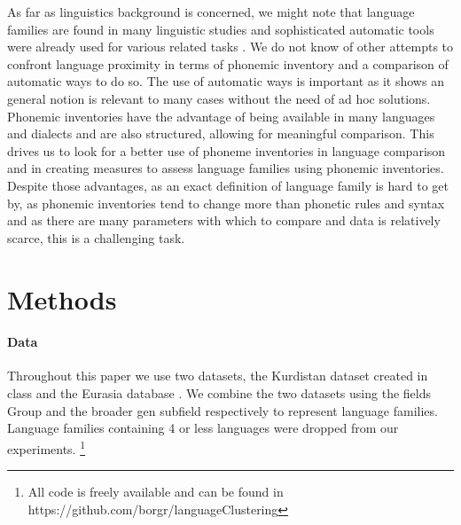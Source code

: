 \documentclass[letterpaper, 11pt]{article}
\begin{document}
As far as linguistics background is concerned, we might note that language families are found in many linguistic studies \cite{aikhenvald1999arawak} and sophisticated automatic tools were already used for various related tasks \cite{bouckaert2012mapping}. We do not know of other attempts to confront language proximity in terms of phonemic inventory and a comparison of automatic ways to do so. The use of automatic ways is important as it shows an general notion is relevant to many cases without the need of ad hoc solutions. 
Phonemic inventories have the advantage of being available in many languages and dialects and are also structured, allowing for meaningful comparison. This drives us to look for a better use of phoneme inventories in language comparison and in creating measures to assess language families using phonemic inventories. Despite those advantages, as an exact definition of language family is hard to get by, as phonemic inventories tend to change more than phonetic rules and syntax \cite{mohammadi2comparative} and as there are many parameters with which to compare and data is relatively scarce, this is a challenging task.

\section{Methods}
\paragraph{Data} Throughout this paper we use two datasets, the Kurdistan dataset created in class and the Eurasia database \cite{Nikolaev2015database}. We combine the two datasets using the fields Group and the broader gen subfield respectively to represent language families. Language families containing 4 or less languages were dropped from our experiments.
\footnote{All code is freely available and can be found in https://github.com/borgr/languageClustering}
\end{document}
